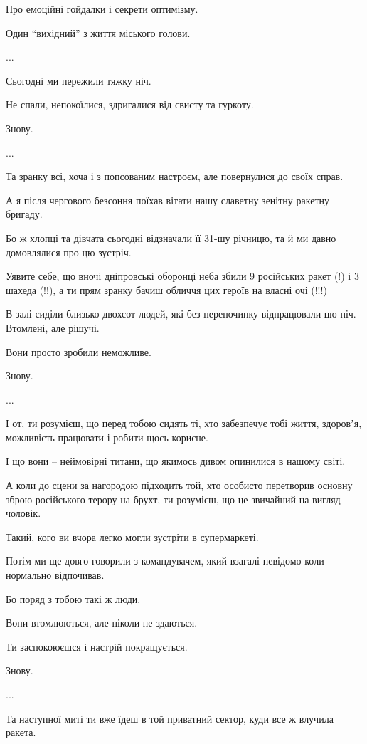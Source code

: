 Про емоційні гойдалки і секрети оптимізму. \par
Один \enquote{вихідний} з життя міського голови. \par
...\par
Сьогодні ми пережили тяжку ніч. \par
Не спали, непокоїлися, здригалися від свисту та гуркоту.\par
Знову. \par
...\par
Та зранку всі, хоча і з попсованим настроєм, але повернулися до своїх справ. \par
А я після чергового безсоння поїхав вітати нашу славетну зенітну ракетну бригаду. \par
Бо ж хлопці та дівчата сьогодні відзначали її 31-шу річницю, та й ми давно домовлялися про цю зустріч. \par
Уявите себе, що вночі дніпровські оборонці неба збили 9 російських ракет (!) і 3 шахеда (!!), а ти прям зранку бачиш обличчя цих героїв на власні очі (!!!)\par
В залі сиділи близько двохсот людей, які без перепочинку відпрацювали цю ніч. Втомлені, але рішучі. \par
Вони просто зробили неможливе.\par
Знову. \par
...\par
І от, ти розумієш, що перед тобою сидять ті, хто забезпечує тобі життя, здоровʼя, можливість працювати і робити щось корисне. \par
І що вони – неймовірні титани, що якимось дивом опинилися в нашому світі. \par
А коли до сцени за нагородою підходить той, хто особисто перетворив основну зброю російського терору на брухт, ти розумієш, що це звичайний на вигляд чоловік.\par
Такий, кого ви вчора легко могли зустріти в супермаркеті. \par
Потім ми ще довго говорили з командувачем, який взагалі невідомо коли нормально відпочивав. \par
Бо поряд з тобою такі ж люди. \par
Вони втомлюються, але ніколи не здаються. \par
Ти заспокоюєшся і настрій покращується. \par
Знову.\par
...\par
Та наступної миті ти вже їдеш в той приватний сектор, куди все ж влучила ракета. \par
